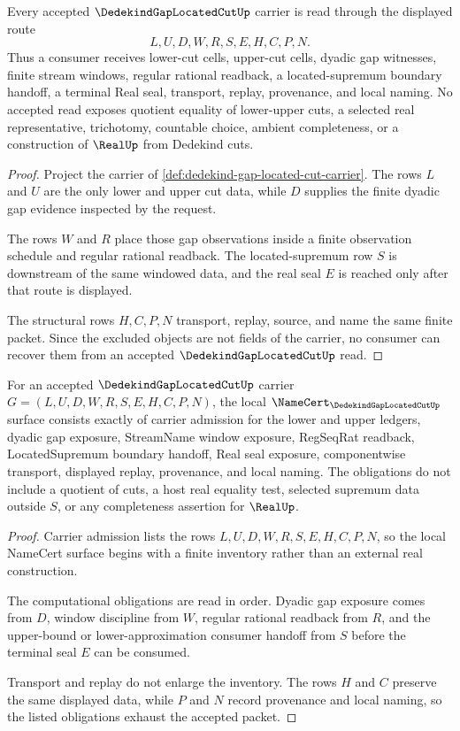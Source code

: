 \begin{theorem}
\label{thm:dedekind-gap-located-cut-carrier}
Every accepted $\DedekindGapLocatedCutUp$ carrier is read through the displayed route
$$
L,U,D,W,R,S,E,H,C,P,N .
$$
Thus a consumer receives lower-cut cells, upper-cut cells, dyadic gap witnesses, finite stream windows, regular rational readback, a located-supremum boundary handoff, a terminal Real seal, transport, replay, provenance, and local naming. No accepted read exposes quotient equality of lower-upper cuts, a selected real representative, trichotomy, countable choice, ambient completeness, or a construction of $\RealUp$ from Dedekind cuts.
\end{theorem}
\begin{proof}
Project the carrier of \autoref{def:dedekind-gap-located-cut-carrier}. The rows $L$ and $U$ are the only lower and upper cut data, while $D$ supplies the finite dyadic gap evidence inspected by the request.

The rows $W$ and $R$ place those gap observations inside a finite observation schedule and regular rational readback. The located-supremum row $S$ is downstream of the same windowed data, and the real seal $E$ is reached only after that route is displayed.

The structural rows $H,C,P,N$ transport, replay, source, and name the same finite packet. Since the excluded objects are not fields of the carrier, no consumer can recover them from an accepted $\DedekindGapLocatedCutUp$ read.
\end{proof}

\begin{theorem}
\label{thm:dedekind-gap-located-cut-obligations}
For an accepted $\DedekindGapLocatedCutUp$ carrier $G=(L,U,D,W,R,S,E,H,C,P,N)$, the local $\NameCert_{\DedekindGapLocatedCutUp}$ surface consists exactly of carrier admission for the lower and upper ledgers, dyadic gap exposure, StreamName window exposure, RegSeqRat readback, LocatedSupremum boundary handoff, Real seal exposure, componentwise transport, displayed replay, provenance, and local naming. The obligations do not include a quotient of cuts, a host real equality test, selected supremum data outside $S$, or any completeness assertion for $\RealUp$.
\end{theorem}
\begin{proof}
Carrier admission lists the rows $L,U,D,W,R,S,E,H,C,P,N$, so the local NameCert surface begins with a finite inventory rather than an external real construction.

The computational obligations are read in order. Dyadic gap exposure comes from $D$, window discipline from $W$, regular rational readback from $R$, and the upper-bound or lower-approximation consumer handoff from $S$ before the terminal seal $E$ can be consumed.

Transport and replay do not enlarge the inventory. The rows $H$ and $C$ preserve the same displayed data, while $P$ and $N$ record provenance and local naming, so the listed obligations exhaust the accepted packet.
\end{proof}


